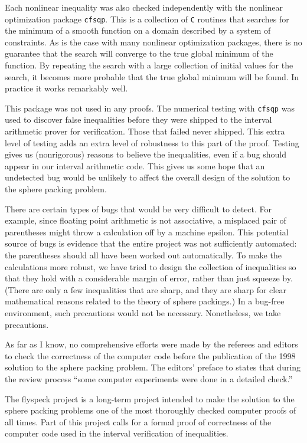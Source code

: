 Each nonlinear inequality was also checked independently with the nonlinear
optimization package {\tt cfsqp}.  This is a collection of {\tt C} routines
that searches for the minimum of a smooth function on a domain described
by a system of constraints.  As is the case with many nonlinear optimization
packages, there is no guarantee that the search will converge to
the true global minimum of the function.   By repeating the search
with a large collection of initial values for the search, it becomes
more probable that the true global minimum will be found.
In practice it works remarkably well.

This package was not used
in any proofs.  The numerical testing with {\tt cfsqp} was used to
discover false inequalities before they were shipped to the interval
arithmetic prover for verification.  Those that failed never shipped.
This extra level of testing adds an extra level of robustness to
this part of the proof.  Testing gives us (nonrigorous)
reasons to believe the inequalities, even if a bug should appear in
our interval arithmetic code.  This gives us some hope that an undetected bug
would be unlikely to affect the overall design of the solution to
the sphere packing problem.


There are certain types of bugs that would be very difficult to detect.
For example, since floating point arithmetic is not associative, a
misplaced pair of parentheses might throw a calculation off by a
machine epsilon.  
This potential source of bugs is evidence that the entire project 
was not sufficiently
automated:  the parentheses should all have been worked out automatically.
To make the calculations more robust, we have tried
to design the collection of inequalities so that they hold with a considerable
margin of error, rather than just squeeze by.  (There are only a few
inequalities that are sharp, and they are sharp for clear mathematical
reasons related to the theory of sphere packings.)  In a bug-free environment,
such precautions would not be necessary.  Nonetheless, we take precautions.

As far as I know, no comprehensive efforts were made by the referees and
editors to check the correctness of the computer code before the
publication of the 1998 solution to the sphere packing problem.  The editors' preface
to \cite{DCG} states that during the review process
``some computer experiments were done in a detailed check.''


The flyspeck project is a long-term project intended to make the solution
to the sphere packing problems one of the most thoroughly checked computer
proofs of all times.  Part of this project calls for a formal proof of correctness of the
computer code used in the interval verification of inequalities.

